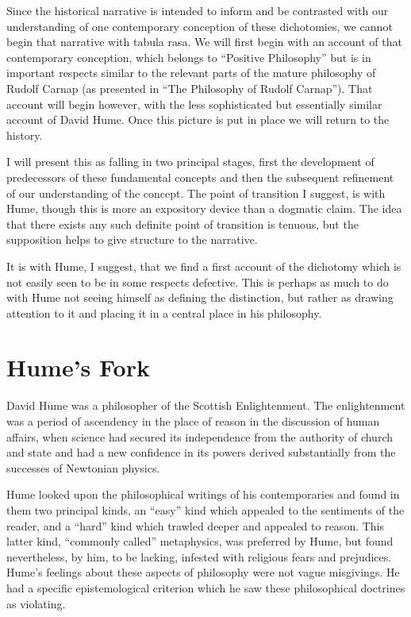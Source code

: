 Since the historical narrative is intended to inform and be contrasted
with our understanding of one contemporary conception of these
dichotomies, we cannot begin that narrative with tabula rasa.
We will first begin with an account of that contemporary conception,
which belongs to ``Positive Philosophy'' but is in important respects
similar to the relevant parts of the mature philosophy of Rudolf
Carnap (as presented in ``The Philosophy of Rudolf
Carnap''\cite{carnap83a}).
That account will begin however, with the less sophisticated but
essentially similar account of David Hume.
Once this picture is put in place we will return to the history.

I will present this as falling in two principal stages, first the
development of predecessors of these fundamental concepts and then the
subsequent refinement of our understanding of the concept. 
The point of transition I suggest, is with Hume, though this is more
an expository device than a dogmatic claim.
The idea that there exists any such definite point of transition is
tenuous, but the supposition helps to give structure to the narrative.

It is with Hume, I suggest, that we find a first account of the
dichotomy which is not easily seen to be in some respects defective. 
This is perhaps as much to do with Hume not seeing himself as defining
the distinction, but rather as drawing attention to it and placing it
in a central place in his philosophy. 

\section{Hume's Fork}\label{HumesFork}

David Hume was a philosopher of the Scottish Enlightenment.
The enlightenment was a period of ascendency in the place of reason in
the discussion of human affairs, when science had secured its
independence from the authority of church and state and had a new
confidence in its powers derived substantially from the successes of
Newtonian physics.

Hume looked upon the philosophical writings of his contemporaries and
found in them two principal kinds, an ``easy'' kind which appealed to
the sentiments of the reader, and a ``hard'' kind which trawled deeper
and appealed to reason.
This latter kind, ``commonly called'' metaphysics, was preferred by
Hume, but found nevertheless, by him, to be lacking, infested with religious 
fears and prejudices.
Hume's feelings about these aspects of philosophy were not vague
misgivings.
He had a specific epistemological criterion which he saw these
philosophical doctrines as violating.


